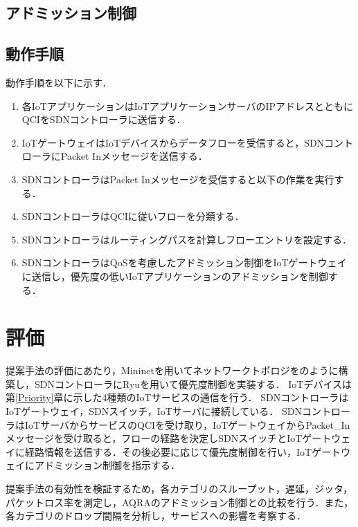 \documentclass[a4paper,10pt,twocolumn,uplatex]{jsarticle}
\begin{document}
\subsection{アドミッション制御}


\subsection{動作手順}
動作手順を以下に示す．

\begin{enumerate} %
  \item 各IoTアプリケーションはIoTアプリケーションサーバのIPアドレスとともにQCIをSDNコントローラに送信する．
  \item IoTゲートウェイはIoTデバイスからデータフローを受信すると，SDNコントローラにPacket Inメッセージを送信する．
  \item SDNコントローラはPacket Inメッセージを受信すると以下の作業を実行する．
  \item SDNコントローラはQCIに従いフローを分類する．
  \item SDNコントローラはルーティングパスを計算しフローエントリを設定する．
  \item SDNコントローラはQoSを考慮したアドミッション制御をIoTゲートウェイに送信し，優先度の低いIoTアプリケーションのアドミッションを制御する．
\end{enumerate}

\section{評価}
提案手法の評価にあたり，Mininetを用いてネットワークトポロジをのように構築し，SDNコントローラにRyuを用いて優先度制御を実装する．
IoTデバイスは第\ref{Priority}章に示した4種類のIoTサービスの通信を行う．
SDNコントローラはIoTゲートウェイ，SDNスイッチ，IoTサーバに接続している．
SDNコントローラはIoTサーバからサービスのQCIを受け取り，IoTゲートウェイからPacket\_Inメッセージを受け取ると，フローの経路を決定しSDNスイッチとIoTゲートウェイに経路情報を送信する．その後必要に応じて優先度制御を行い，IoTゲートウェイにアドミッション制御を指示する．\par
提案手法の有効性を検証するため，各カテゴリのスループット，遅延，ジッタ，パケットロス率を測定し，AQRAのアドミッション制御との比較を行う．また，各カテゴリのドロップ間隔を分析し，サービスへの影響を考察する．\par
\end{document}
